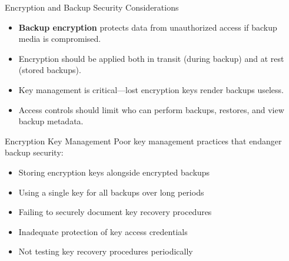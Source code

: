 \documentclass{beamer}
\begin{document}
\begin{frame}{Encryption and Backup Security Considerations}
    \begin{itemize}
        \item \textbf{Backup encryption} protects data from unauthorized access if backup media is compromised.
        \item Encryption should be applied both in transit (during backup) and at rest (stored backups).
        \item Key management is critical—lost encryption keys render backups useless.
        \item Access controls should limit who can perform backups, restores, and view backup metadata.
    \end{itemize}
    
    \begin{alertblock}{Encryption Key Management}
        \scriptsize
        Poor key management practices that endanger backup security:
        \begin{itemize}
            \item Storing encryption keys alongside encrypted backups
            \item Using a single key for all backups over long periods
            \item Failing to securely document key recovery procedures
            \item Inadequate protection of key access credentials
            \item Not testing key recovery procedures periodically
        \end{itemize}
    \end{alertblock}
\end{frame}
\end{document}
